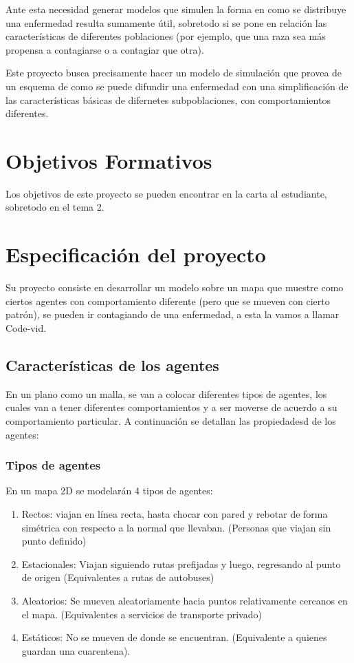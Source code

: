 \documentclass[11pt]{article}
\begin{document}
Ante esta necesidad generar modelos que simulen la forma en como se distribuye una enfermedad resulta sumamente útil, sobretodo si se pone en relación las características de diferentes poblaciones (por ejemplo, que una raza sea más propensa a contagiarse o a contagiar que otra).

Este proyecto busca precisamente hacer un modelo de simulación que provea de un esquema de como se puede difundir una enfermedad con una simplificación de las características básicas de difernetes subpoblaciones, con comportamientos diferentes.

 


\section{Objetivos Formativos}

Los objetivos de este proyecto se pueden encontrar en la carta al estudiante, sobretodo en el tema 2.

\section{Especificación del proyecto}

Su proyecto consiste en desarrollar un modelo sobre un mapa que muestre como ciertos agentes con comportamiento diferente (pero que se mueven con cierto patrón), se pueden ir contagiando de una enfermedad, a esta la vamos a llamar Code-vid. 

\subsection{Características de los agentes}

En un plano como un malla, se van a colocar diferentes tipos de agentes, los cuales van a tener diferentes comportamientos y a ser moverse de acuerdo a su comportamiento particular. A continuación se detallan las propiedadesd de los agentes:

\subsubsection{Tipos de agentes}

En un mapa 2D se modelarán 4 tipos de agentes:
\begin{enumerate}
\item Rectos: viajan en línea recta, hasta chocar con pared y rebotar de forma simétrica con respecto a la normal que llevaban. (Personas que viajan sin punto definido)
\item Estacionales: Viajan siguiendo rutas prefijadas y luego, regresando al punto de origen (Equivalentes a rutas de autobuses)
\item Aleatorios: Se mueven aleatoriamente hacia puntos relativamente cercanos en el mapa. (Equivalentes a servicios de transporte privado)
\item Estáticos: No se mueven de donde se encuentran. (Equivalente a quienes guardan una cuarentena).
\end{enumerate}
\end{document}
